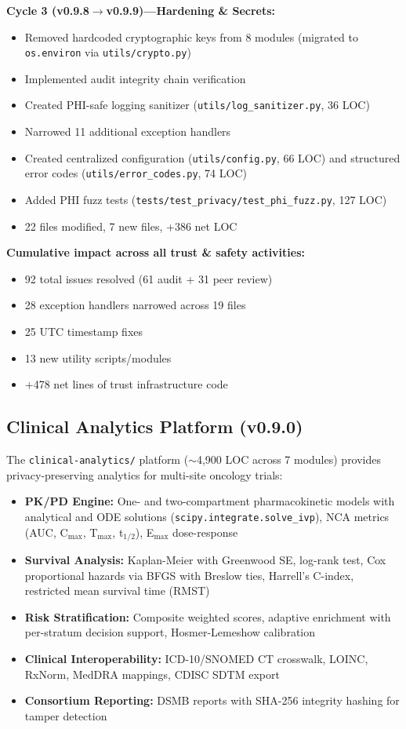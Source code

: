 \textbf{Cycle 3 (v0.9.8$\to$v0.9.9)---Hardening \& Secrets:}
\begin{itemize}
  \item Removed hardcoded cryptographic keys from 8 modules (migrated to \texttt{os.environ} via \texttt{utils/crypto.py})
  \item Implemented audit integrity chain verification
  \item Created PHI-safe logging sanitizer (\texttt{utils/log\_sanitizer.py}, 36 LOC)
  \item Narrowed 11 additional exception handlers
  \item Created centralized configuration (\texttt{utils/config.py}, 66 LOC) and structured error codes (\texttt{utils/error\_codes.py}, 74 LOC)
  \item Added PHI fuzz tests (\texttt{tests/test\_privacy/test\_phi\_fuzz.py}, 127 LOC)
  \item 22 files modified, 7 new files, +386 net LOC
\end{itemize}

\textbf{Cumulative impact across all trust \& safety activities:}
\begin{itemize}
  \item 92 total issues resolved (61 audit + 31 peer review)
  \item 28 exception handlers narrowed across 19 files
  \item 25 UTC timestamp fixes
  \item 13 new utility scripts/modules
  \item +478 net lines of trust infrastructure code
\end{itemize}

\subsection{Clinical Analytics Platform (v0.9.0)}

The \texttt{clinical-analytics/} platform ($\sim$4,900 LOC across 7 modules) provides privacy-preserving analytics for multi-site oncology trials:

\begin{itemize}
  \item \textbf{PK/PD Engine:} One- and two-compartment pharmacokinetic models with analytical and ODE solutions (\texttt{scipy.integrate.solve\_ivp}), NCA metrics (AUC, C$_{\text{max}}$, T$_{\text{max}}$, t$_{1/2}$), E$_{\text{max}}$ dose-response
  \item \textbf{Survival Analysis:} Kaplan-Meier with Greenwood SE, log-rank test, Cox proportional hazards via BFGS with Breslow ties, Harrell's C-index, restricted mean survival time (RMST)
  \item \textbf{Risk Stratification:} Composite weighted scores, adaptive enrichment with per-stratum decision support, Hosmer-Lemeshow calibration
  \item \textbf{Clinical Interoperability:} ICD-10/SNOMED CT crosswalk, LOINC, RxNorm, MedDRA mappings, CDISC SDTM export~\cite{cdisc2024sdtm}
  \item \textbf{Consortium Reporting:} DSMB reports with SHA-256 integrity hashing for tamper detection
\end{itemize}

